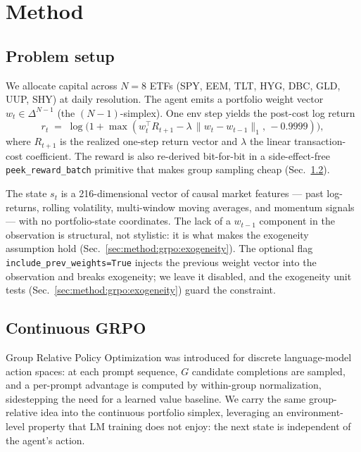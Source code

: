 
\section{Method}
\label{sec:method}

\subsection{Problem setup}

We allocate capital across $N{=}8$ ETFs (SPY, EEM, TLT, HYG, DBC, GLD, UUP,
SHY) at daily resolution. The agent emits a portfolio weight vector
$w_t \in \Delta^{N-1}$ (the $(N{-}1)$-simplex). One env step yields the
post-cost log return
\begin{equation}
\label{eq:reward}
r_t \;=\; \log\!\big(1 + \max(w_t^{\top} R_{t+1} - \lambda\, \|w_t - w_{t-1}\|_1,\, -0.9999)\big),
\end{equation}
where $R_{t+1}$ is the realized one-step return vector and $\lambda$ the
linear transaction-cost coefficient. The reward is also re-derived
bit-for-bit in a side-effect-free \texttt{peek\_reward\_batch} primitive
that makes group sampling cheap (Sec.~\ref{sec:method:grpo}).

The state $s_t$ is a 216-dimensional vector of causal market features --- past
log-returns, rolling volatility, multi-window moving averages, and momentum
signals --- with no portfolio-state coordinates. The lack of a $w_{t-1}$
component in the observation is structural, not stylistic: it is what makes
the exogeneity assumption hold (Sec.~\ref{sec:method:grpo:exogeneity}). The
optional flag \verb|include_prev_weights=True| injects the previous
weight vector into the observation and breaks exogeneity; we leave it
disabled, and the exogeneity unit tests
(Sec.~\ref{sec:method:grpo:exogeneity}) guard the constraint.

\subsection{Continuous GRPO}
\label{sec:method:grpo}

Group Relative Policy Optimization \citep{shao2024deepseekmath} was
introduced for discrete language-model action spaces: at each prompt
sequence, $G$ candidate completions are sampled, and a per-prompt
advantage is computed by within-group normalization, sidestepping the need
for a learned value baseline. We carry the same group-relative idea into
the continuous portfolio simplex, leveraging an environment-level property
that LM training does not enjoy: the next state is independent of the
agent's action.

